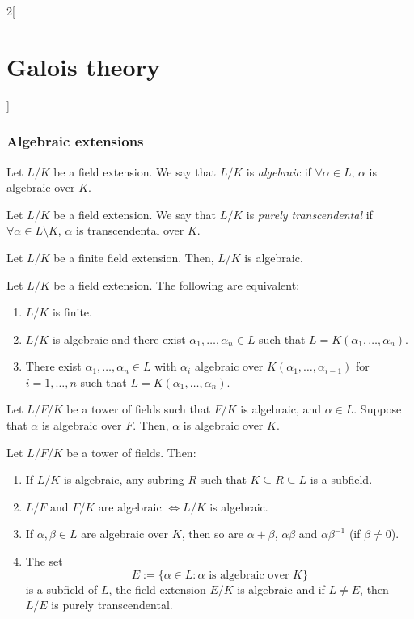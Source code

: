 \documentclass[../../../main.tex]{subfiles}
\begin{document}
\begin{multicols}{2}[\section{Galois theory}]
  \subsubsection{Algebraic extensions}
  \begin{definition}
    Let $L/K$ be a field extension. We say that $L/K$ is \emph{algebraic} if $\forall\alpha\in L$, $\alpha$ is algebraic over $K$.
  \end{definition}
  \begin{definition}
    Let $L/K$ be a field extension. We say that $L/K$ is \emph{purely transcendental} if $\forall\alpha\in L\setminus K$, $\alpha$ is transcendental over $K$.
  \end{definition}
  \begin{lemma}
    Let $L/K$ be a finite field extension. Then, $L/K$ is algebraic.
  \end{lemma}
  \begin{proposition}
    Let $L/K$ be a field extension. The following are equivalent:
    \begin{enumerate}
      \item $L/K$ is finite.
      \item $L/K$ is algebraic and there exist $\alpha_1,\ldots,\alpha_n\in L$ such that $L=K(\alpha_1,\ldots,\alpha_n)$.
      \item There exist $\alpha_1,\ldots,\alpha_n\in L$ with $\alpha_i$ algebraic over $K(\alpha_1,\ldots,\alpha_{i-1})$ for $i=1,\ldots,n$ such that $L=K(\alpha_1,\ldots,\alpha_n)$.
    \end{enumerate}
  \end{proposition}
  \begin{proposition}
    Let $L/F/K$ be a tower of fields such that $F/K$ is algebraic, and $\alpha\in L$. Suppose that $\alpha$ is algebraic over $F$. Then, $\alpha$ is algebraic over $K$.
  \end{proposition}
  \begin{proposition}
    Let $L/F/K$ be a tower of fields. Then:
    \begin{enumerate}
      \item If $L/K$ is algebraic, any subring $R$ such that $K\subseteq R\subseteq L$ is a subfield.
      \item $L/F$ and $F/K$ are algebraic $\iff L/K$ is algebraic.
      \item If $\alpha,\beta\in L$ are algebraic over $K$, then so are $\alpha+\beta$, $\alpha\beta$ and $\alpha\beta^{-1}$ (if $\beta\ne 0$).
      \item The set $$E:=\{\alpha\in L:\alpha\text{ is algebraic over }K\}$$ is a subfield of $L$, the field extension $E/K$ is algebraic and if $L\ne E$, then $L/E$ is purely transcendental.
    \end{enumerate}
  \end{proposition}

\end{multicols}
\end{document}
